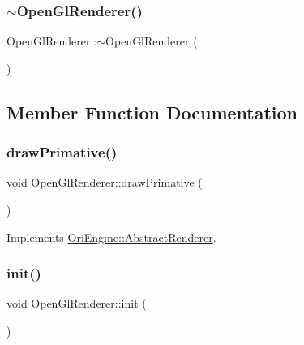 \subsubsection{\texorpdfstring{$\sim$\+Open\+Gl\+Renderer()}{~OpenGlRenderer()}}
{\footnotesize\ttfamily Open\+Gl\+Renderer\+::$\sim$\+Open\+Gl\+Renderer (\begin{DoxyParamCaption}{ }\end{DoxyParamCaption})}



\subsection{Member Function Documentation}
\hypertarget{class_ori_engine_1_1_open_gl_renderer_ad75e25784e6aa3331f69b81b1b3774ff}{}\label{class_ori_engine_1_1_open_gl_renderer_ad75e25784e6aa3331f69b81b1b3774ff} 
\subsubsection{\texorpdfstring{draw\+Primative()}{drawPrimative()}}
{\footnotesize\ttfamily void Open\+Gl\+Renderer\+::draw\+Primative (\begin{DoxyParamCaption}{ }\end{DoxyParamCaption})\hspace{0.3cm}{\ttfamily [virtual]}}



Implements \hyperlink{class_ori_engine_1_1_abstract_renderer_aece5371f0d8b99e6ee456845aba89f8d}{Ori\+Engine\+::\+Abstract\+Renderer}.

\hypertarget{class_ori_engine_1_1_open_gl_renderer_a702c4cfb099f77a04111740b9f3834e8}{}\label{class_ori_engine_1_1_open_gl_renderer_a702c4cfb099f77a04111740b9f3834e8} 
\subsubsection{\texorpdfstring{init()}{init()}}
{\footnotesize\ttfamily void Open\+Gl\+Renderer\+::init (\begin{DoxyParamCaption}{ }\end{DoxyParamCaption})\hspace{0.3cm}{\ttfamily [virtual]}}



